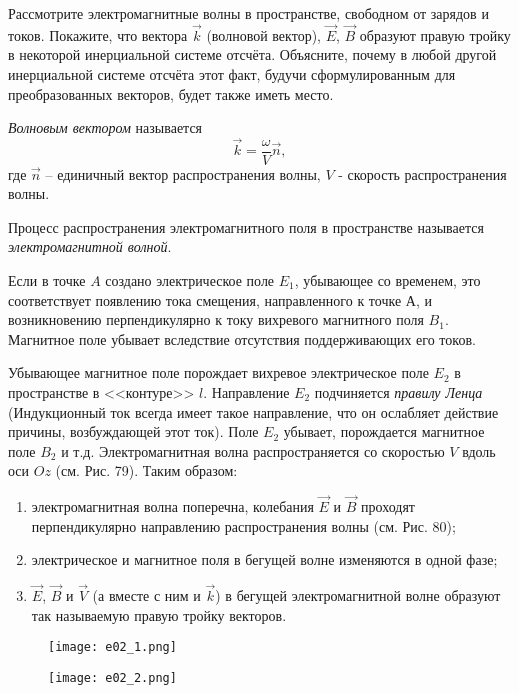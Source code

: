 \documentclass[__main__.tex]{subfiles}
\begin{document}
Рассмотрите электромагнитные волны в пространстве, свободном от зарядов и токов. Покажите, что вектора $\vec{k}$ (волновой вектор), $\vec{E}$, $\vec{B}$ образуют правую тройку в некоторой инерциальной системе отсчёта. Объясните, почему в любой другой инерциальной системе отсчёта этот факт, будучи сформулированным для преобразованных векторов, будет также иметь место.\\

\begin{definition}
    \textit{Волновым вектором} называется
    $$
        \vec{k}=\frac{\omega}{V}\vec{n},
    $$
    где $\vec{n}$ -- единичный вектор распространения волны, $V$ - скорость распространения волны.
\end{definition}

\begin{definition}
    Процесс распространения электромагнитного поля в пространстве называется \textit{электромагнитной волной}.
\end{definition}

Если в точке $A$ создано электрическое поле $E_1$, убывающее со временем, это соответствует появлению тока смещения, направленного к точке А, и возникновению перпендикулярно к току вихревого магнитного поля $B_1$. Магнитное поле убывает вследствие отсутствия поддерживающих его токов.

Убывающее магнитное поле порождает вихревое электрическое поле $E_2$ в пространстве в <<контуре>> $l$. Направление $E_2$ подчиняется \textit{правилу Ленца} (Индукционный ток всегда имеет такое направление, что он ослабляет действие причины, возбуждающей этот ток). Поле $E_2$ убывает, порождается магнитное поле $B_2$ и т.д. Электромагнитная волна распространяется со скоростью $V$ вдоль оси $Oz$ (см. Рис. 79). Таким образом:

\begin{enumerate}
    \item
          электромагнитная волна поперечна, колебания $\vec{E}$ и $\vec{B}$ проходят перпендикулярно направлению распространения волны (см. Рис. 80);
    \item
          электрическое и магнитное поля в бегущей волне изменяются в одной фазе;
    \item
          $\vec{E}$, $\vec{B}$ и $\vec{V}$ (а вместе с ним и $\vec{k}$) в бегущей электромагнитной волне образуют так называемую правую тройку векторов.
\end{enumerate}

\begin{figure}[h]
    \begin{minipage}{.6\linewidth}
        \texttt{[image: e02\_1.png]}
    \end{minipage}
    \hfill
    \begin{minipage}{.4\linewidth}
        \texttt{[image: e02\_2.png]}
    \end{minipage}
\end{figure}
\end{document}
